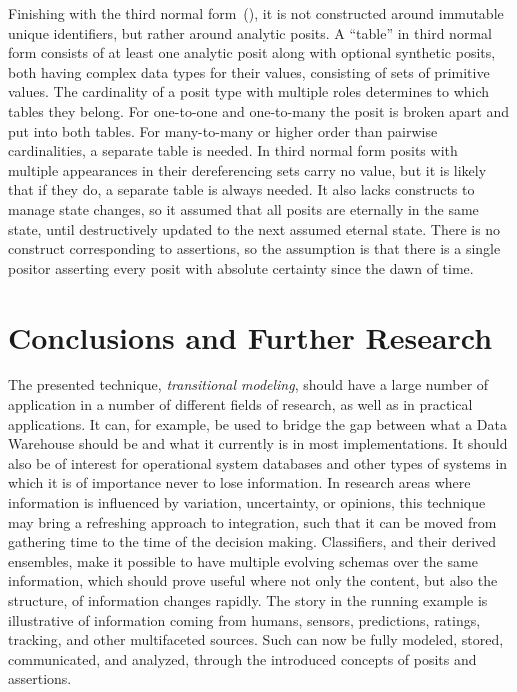 \documentclass[sfsidenotes,nobib,twoside,symmetric]{tufte-handout}
\renewcommand{\parencite}[2][0pt]{(\citeauthor{#2})\sidenote[][#1]{\fullcite{#2}}}
\begin{document}
Finishing with the third normal form~\parencite{Kent, Codd}, it is not constructed around immutable unique identifiers, but rather around analytic posits. A \enquote{table} in third normal form consists of at least one analytic posit along with optional synthetic posits, both having complex data types for their values, consisting of sets of primitive values. The cardinality of a posit type with multiple roles determines to which tables they belong. For one-to-one and one-to-many the posit is broken apart and put into both tables. For many-to-many or higher order than pairwise cardinalities, a separate table is needed. In third normal form posits with multiple appearances in their dereferencing sets carry no value, but it is likely that if they do, a separate table is always needed. It also lacks constructs to manage state changes, so it assumed that all posits are eternally in the same state, until destructively updated to the next assumed eternal state. There is no construct corresponding to assertions, so the assumption is that there is a single positor asserting every posit with absolute certainty since the dawn of time.


  
\section{Conclusions and Further Research}
% 
The presented technique, \emph{transitional modeling}, should have a large number of application in a number of different fields of research, as well as in practical applications. It can, for example, be used to bridge the gap between what a Data Warehouse should be and what it currently is in most implementations. It should also be of interest for operational system databases and other types of systems in which it is of importance never to lose information. In research areas where information is influenced by variation, uncertainty, or opinions, this technique may bring a refreshing approach to integration, such that it can be moved from gathering time to the time of the decision making. Classifiers, and their derived ensembles, make it possible to have multiple evolving schemas over the same information, which should prove useful where not only the content, but also the structure, of information changes rapidly. The story in the running example is illustrative of information coming from humans, sensors, predictions, ratings, tracking, and other multifaceted sources. Such can now be fully modeled, stored, communicated, and analyzed, through the introduced concepts of posits and assertions.
\end{document}
